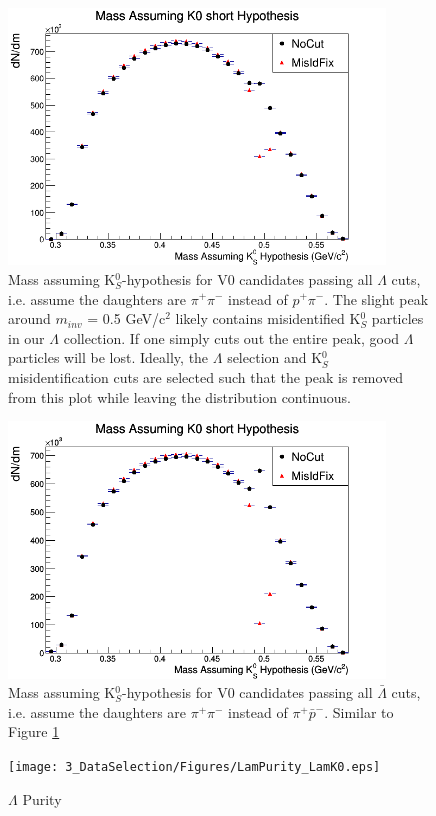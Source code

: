 \begin{figure}[h]
  \centering
  \includegraphics[width=100mm]{3_DataSelection/Figures/MassAssumingK0ShortHypothesis_LamK0.png}
  \caption[K$^{0}_{S}$ contamination in $\Lambda$ collection]{Mass assuming K$^{0}_{S}$-hypothesis for V0 candidates passing all $\Lambda$ cuts, i.e. assume the daughters are $\pi^{+}\pi^{-}$ instead of $p^{+}\pi^{-}$.  The slight peak around $m_{inv}$ = 0.5 GeV/c$^{2}$ likely contains misidentified K$^{0}_{S}$ particles in our $\Lambda$ collection.  If one simply cuts out the entire peak, good $\Lambda$ particles will be lost.  Ideally, the $\Lambda$ selection and K$^{0}_{S}$ misidentification cuts are selected such that the peak is removed from this plot while leaving the distribution continuous.}
  \label{fig:MassAssK0ShortHyp_LamK0}
\end{figure}

\begin{figure}[h]
  \centering
  \includegraphics[width=100mm]{3_DataSelection/Figures/MassAssumingK0ShortHypothesis_ALamK0.png}
  \caption[K$^{0}_{S}$ contamination in $\bar{\Lambda}$ collection]{Mass assuming K$^{0}_{S}$-hypothesis for V0 candidates passing all $\bar{\Lambda}$ cuts, i.e. assume the daughters are $\pi^{+}\pi^{-}$ instead of $\pi^{+}\bar{p}^{-}$.  Similar to Figure \ref{fig:MassAssK0ShortHyp_LamK0}}
  \label{fig:MassAssK0ShortHyp_ALamK0}
\end{figure}

\begin{figure}[h]
  \centering
  \texttt{[image: 3\_DataSelection/Figures/LamPurity\_LamK0.eps]}
  \caption[$\Lambda$ Purity]{$\Lambda$ Purity}
  \label{fig:LamPurity}
\end{figure}